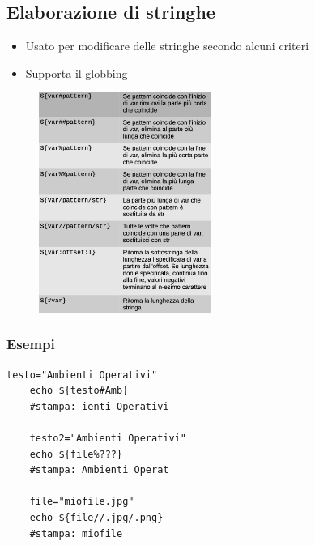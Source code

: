\documentclass[../main.tex]{subfiles}
\begin{document}
\pagebreak
\subsection{Elaborazione di stringhe}
\begin{itemize}
    \item Usato per modificare delle stringhe secondo alcuni criteri
    \item Supporta il globbing
\end{itemize}
\begin{figure}[h]
    \centering
    \includegraphics[width=0.5\textwidth]{../images/elaborazioneStringhe.png}
\end{figure}

\subsubsection{Esempi}
\begin{lstlisting}[style=bash]
    testo="Ambienti Operativi"
    echo ${testo#Amb}
    #stampa: ienti Operativi

    testo2="Ambienti Operativi"
    echo ${file%???}
    #stampa: Ambienti Operat

    file="miofile.jpg"
    echo ${file//.jpg/.png}
    #stampa: miofile
\end{lstlisting}
\end{document}
